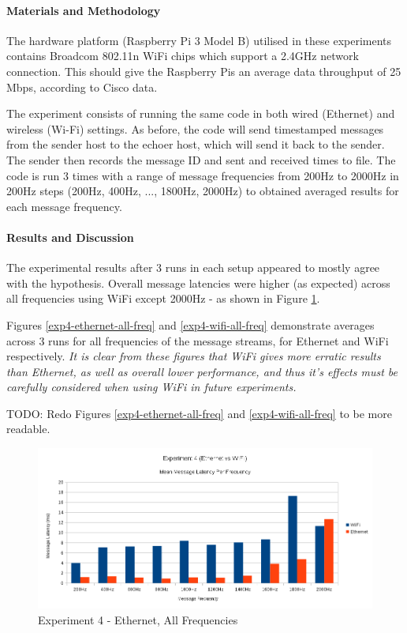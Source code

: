 \documentclass[../dissertation.tex]{subfiles}
\begin{document}
\paragraph{Materials and Methodology} The hardware platform (Raspberry Pi 3 Model B) utilised in these experiments contains Broadcom 802.11n WiFi chips which support a 2.4GHz network connection. This should give the Raspberry Pis an average data throughput of 25 Mbps, according to Cisco data\cite{florwick2013wireless}.

The experiment consists of running the same code in both wired (Ethernet) and wireless (Wi-Fi) settings. As before, the code will send timestamped messages from the sender host to the echoer host, which will send it back to the sender. The sender then records the message ID and sent and received times to file. The code is run 3 times with a range of message frequencies from 200Hz to 2000Hz in 200Hz steps (200Hz, 400Hz, ..., 1800Hz, 2000Hz) to obtained averaged results for each message frequency.

\paragraph{Results and Discussion} The experimental results after 3 runs in each setup appeared to mostly agree with the hypothesis. Overall message latencies were higher (as expected) across all frequencies using WiFi except 2000Hz - as shown in Figure \ref{exp4-means-all-freq}.

Figures \ref{exp4-ethernet-all-freq} and \ref{exp4-wifi-all-freq} demonstrate averages across 3 runs for all frequencies of the message streams, for Ethernet and WiFi respectively. \textit{It is clear from these figures that WiFi gives more erratic results than Ethernet, as well as overall lower performance, and thus it's effects must be carefully considered when using WiFi in future experiments.}

TODO: Redo Figures \ref{exp4-ethernet-all-freq} and \ref{exp4-wifi-all-freq} to be more readable.

\begin{figure}[H]
\centering
\includegraphics[width=\textwidth]{images/experiment4/mean_per_frequency.png}
\caption{Experiment 4 - Ethernet, All Frequencies}
\label{exp4-means-all-freq}
\end{figure}
\end{document}

